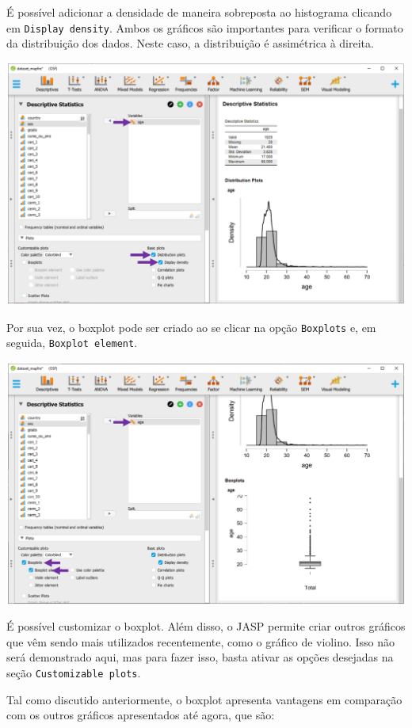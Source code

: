 \documentclass[
]{book}
\begin{document}
É possível adicionar a densidade de maneira sobreposta ao histograma clicando em \texttt{Display\ density}. Ambos os gráficos são importantes para verificar o formato da distribuição dos dados. Neste caso, a distribuição é assimétrica à direita.

\includegraphics{./img/cap_desc_jasp_grafico_densidade.png}

Por sua vez, o boxplot pode ser criado ao se clicar na opção \texttt{Boxplots} e, em seguida, \texttt{Boxplot\ element}.

\includegraphics{./img/cap_desc_jasp_grafico_boxplot.png}

É possível customizar o boxplot. Além disso, o JASP permite criar outros gráficos que vêm sendo mais utilizados recentemente, como o gráfico de violino. Isso não será demonstrado aqui, mas para fazer isso, basta ativar as opções desejadas na seção \texttt{Customizable\ plots}.

Tal como discutido anteriormente, o boxplot apresenta vantagens em comparação com os outros gráficos apresentados até agora, que são:
\end{document}
